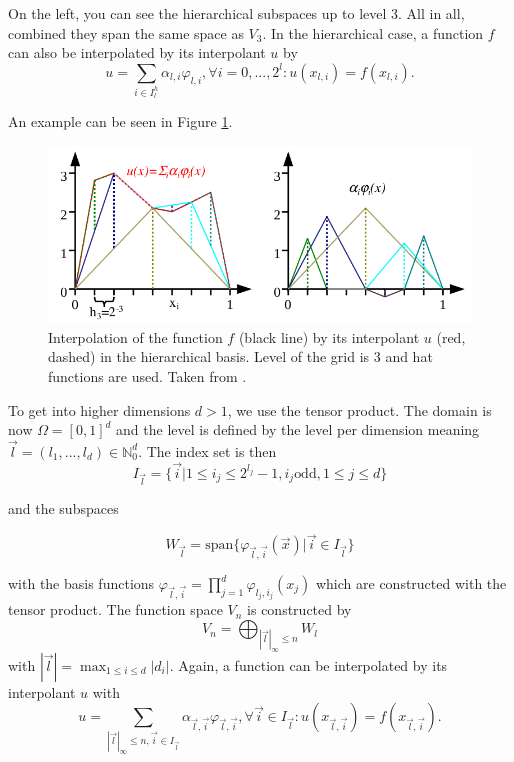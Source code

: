 On the left, you can see the hierarchical subspaces up to level 3. All in all, combined they span the same space as $ V_3 $. In the hierarchical case, a function $ f $ can also be interpolated by its interpolant $ u $ by 
\begin{equation}
	u = \sum_{i \in I_l^h}\alpha_{l,i} \varphi_{l,i}, \forall i = 0,...,2^l: u(x_{l,i}) = f(x_{l,i}).
\end{equation}

An example can be seen in Figure \ref{fig:weighted_sum_hierarchical}.

\begin{figure}[htbp!]
	\centering
	\includegraphics[scale=0.5]{figures/weighted_sum_hierarchical.png}
	\caption{ Interpolation of the function $ f $ (black line) by its interpolant $ u $ (red, dashed) in the hierarchical basis. Level of the grid is 3 and hat functions are used. Taken from \cite{pfluger2010spatially}.}
	\label{fig:weighted_sum_hierarchical}
\end{figure}

To get into higher dimensions $ d > 1 $, we use the tensor product. The domain is now $ \Omega = [0,1]^d $ and the level is defined by the level per dimension meaning $ \vec{l} = (l_1, ..., l_d) \in \mathbb{N}_0^d $. The index set is then
\begin{equation}
	I_{\vec{l}} = \{ \vec{i} | 1 \le i_j \le 2^{l_j} -1 , i_j \text{odd}, 1 \le j \le d \}
\end{equation}

and the subspaces 

\begin{equation}
	W_{\vec{l}} = \text{span}\{ \varphi_{\vec{l},\vec{i}}( \vec{x} ) | \vec{i} \in I_{\vec{l}}\}
\end{equation}

with the basis functions $ \varphi_{\vec{l},\vec{i}} = \prod_{j=1}^{d} \varphi_{l_j,i_j}(x_j) $ which are constructed with the tensor product. The function space $ V_n $ is constructed by
\begin{equation}
	V_n = \bigoplus_{|\vec{l}|_\infty \le n} W_l
\end{equation}
with $ |\vec{l}| = \max_{1 \le i \le d} |d_i| $. Again, a function can be interpolated by its interpolant $ u $ with
\begin{equation}
	u = \sum_{|\vec{l}|_\infty \le n, \vec{i} \in I_{\vec{l}}}\alpha_{\vec{l},\vec{i}} \varphi_{\vec{l},\vec{i}}, \forall \vec{i} \in I_{\vec{l}}: u(x_{\vec{l},\vec{i}}) = f(x_{\vec{l},\vec{i}}).
\end{equation}

